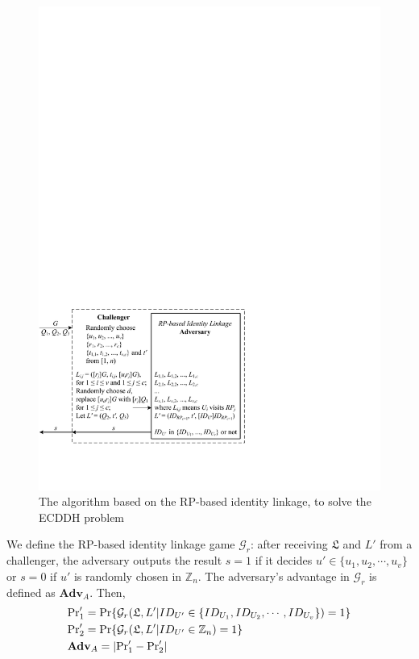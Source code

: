 \begin{figure}[tb]
  \centering
  \includegraphics[width=0.97\linewidth]{fig/dalgorithm.pdf}
  \caption{The algorithm based on the RP-based identity linkage, to solve the ECDDH problem}
  \label{fig:dalgorithm}
\end{figure}

We define the RP-based identity linkage game $\mathcal{G}_r$:
after receiving $\mathfrak{L}$ and $L'$ from a challenger,
    the adversary outputs the result $s = 1$ if it decides $u' \in \{u_1, u_2, \cdots, u_v\}$ or $s = 0$ if $u'$ is randomly chosen in $\mathbb{Z}_n$.
The adversary's advantage in $\mathcal{G}_r$ is defined as $\mathbf{Adv}_{A}$.
Then,
\begin{align*}
&{\rm Pr}'_1={\rm Pr}\{\mathcal{G}_r(\mathfrak{L}, L'|ID_{U'} \in \{ID_{U_1}, ID_{U_2}, \cdots, ID_{U_v}\})=1\} \\
&{\rm Pr}'_2={\rm Pr}\{\mathcal{G}_r(\mathfrak{L}, L'|ID_{U'} \in \mathbb{Z}_n)=1\}\\
&{\mathbf{Adv}}_{A}=|{\rm Pr}'_1-{\rm Pr}'_2|
\end{align*}

